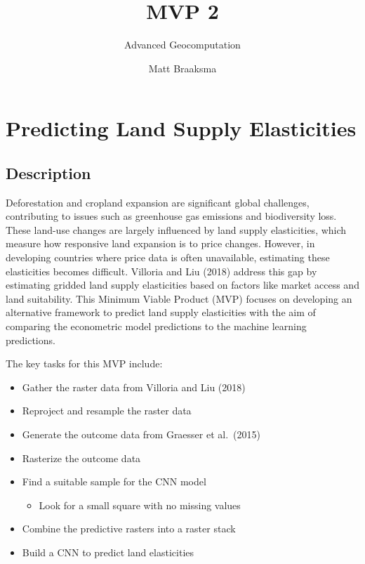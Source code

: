 \documentclass[
  letterpaper,
]{article}
\title{MVP 2}
\subtitle{Advanced Geocomputation}
\author{Matt Braaksma}
\date{}
\providecommand{\tightlist}{%
  \setlength{\itemsep}{0pt}\setlength{\parskip}{0pt}}\usepackage{longtable,booktabs,array}
\renewcommand*\contentsname{Table of contents}
\newcommand\contentsname{Table of contents}
\begin{document}
\maketitle

\renewcommand*\contentsname{Table of contents}
{
\hypersetup{linkcolor=}
\setcounter{tocdepth}{3}
\tableofcontents
}
\section{Predicting Land Supply
Elasticities}\label{predicting-land-supply-elasticities}

\subsection{Description}\label{description}

Deforestation and cropland expansion are significant global challenges,
contributing to issues such as greenhouse gas emissions and biodiversity
loss. These land-use changes are largely influenced by land supply
elasticities, which measure how responsive land expansion is to price
changes. However, in developing countries where price data is often
unavailable, estimating these elasticities becomes difficult. Villoria
and Liu (2018) address this gap by estimating gridded land supply
elasticities based on factors like market access and land suitability.
This Minimum Viable Product (MVP) focuses on developing an alternative
framework to predict land supply elasticities with the aim of comparing
the econometric model predictions to the machine learning predictions.

The key tasks for this MVP include:

\begin{itemize}
\tightlist
\item
  Gather the raster data from Villoria and Liu (2018)
\item
  Reproject and resample the raster data
\item
  Generate the outcome data from Graesser et al.~(2015)
\item
  Rasterize the outcome data
\item
  Find a suitable sample for the CNN model

  \begin{itemize}
  \tightlist
  \item
    Look for a small square with no missing values
  \end{itemize}
\item
  Combine the predictive rasters into a raster stack
\item
  Build a CNN to predict land elasticities
\end{itemize}
\end{document}
